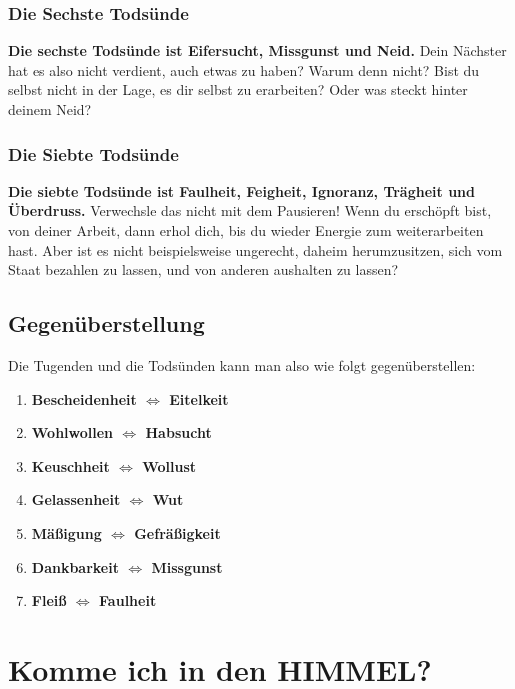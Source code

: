 \documentclass[12pt,a5paper]{article}
\newcommand{\Himmel}[0]{\textbf{HIMMEL}}
\begin{document}
	\subsubsection{Die Sechste Tods\"unde}
		\textbf{Die sechste Tods\"unde ist Eifersucht,
		Missgunst und Neid.}
		Dein N\"achster hat es also nicht verdient,
		auch etwas zu haben?
		Warum denn nicht?
		Bist du selbst nicht in der Lage,
		es dir selbst zu erarbeiten?
		Oder was steckt hinter deinem Neid?

	\subsubsection{Die Siebte Tods\"unde}
		\textbf{Die siebte Tods\"unde ist Faulheit,
		Feigheit,
		Ignoranz,
		Tr\"agheit und \"Uberdruss.}
		Verwechsle das nicht mit dem Pausieren!
		Wenn du ersch\"opft bist,
		von deiner Arbeit,
		dann erhol dich,
		bis du wieder Energie zum weiterarbeiten hast.
		Aber ist es nicht beispielsweise ungerecht,
		daheim herumzusitzen,
		sich vom Staat bezahlen zu lassen,
		und von anderen aushalten zu lassen?

	\newpage
	\subsection{Gegen\"uberstellung}
		Die Tugenden und die Todsünden kann man also wie folgt gegen\"uberstellen:
		\begin{enumerate}
			\item \textbf{Bescheidenheit $\Longleftrightarrow$ Eitelkeit}
			\item \textbf{Wohlwollen $\Longleftrightarrow$ Habsucht}
			\item \textbf{Keuschheit $\Longleftrightarrow$ Wollust}
			\item \textbf{Gelassenheit $\Longleftrightarrow$ Wut}
			\item \textbf{M\"a{\ss}igung $\Longleftrightarrow$ Gefr\"a{\ss}igkeit}
			\item \textbf{Dankbarkeit $\Longleftrightarrow$ Missgunst}
			\item \textbf{Flei{\ss} $\Longleftrightarrow$ Faulheit}
		\end{enumerate}

	\newpage
	\section{Komme ich in den {\Himmel}?}
	
\end{document}
